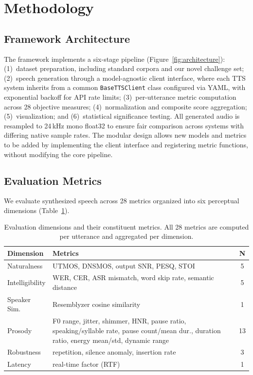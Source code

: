 \section{Methodology}

\subsection{Framework Architecture}

The framework implements a six-stage pipeline
(Figure~\ref{fig:architecture}): (1)~dataset preparation, including
standard corpora and our novel challenge set; (2)~speech generation through
a model-agnostic client interface, where each TTS system inherits from a
common \texttt{BaseTTSClient} class configured via YAML, with exponential
backoff for API rate limits; (3)~per-utterance metric computation across 28
objective measures; (4)~normalization and composite score aggregation;
(5)~visualization; and (6)~statistical significance testing. All generated
audio is resampled to 24\,kHz mono float32 to ensure fair comparison across
systems with differing native sample rates. The modular design allows new
models and metrics to be added by implementing the client interface and
registering metric functions, without modifying the core pipeline.

\subsection{Evaluation Metrics}

We evaluate synthesized speech across 28 metrics organized into six
perceptual dimensions (Table~\ref{tab:dimensions}).

\begin{table}[t]
\centering
\caption{Evaluation dimensions and their constituent metrics. All 28 metrics
are computed per utterance and aggregated per dimension.}
\label{tab:dimensions}
\small
\begin{tabular}{@{}p{1.6cm}p{4.4cm}c@{}}
\toprule
\textbf{Dimension} & \textbf{Metrics} & \textbf{N} \\
\midrule
Naturalness & UTMOS, DNSMOS, output SNR, PESQ, STOI & 5 \\
Intelligibility & WER, CER, ASR mismatch, word skip rate, semantic distance & 5 \\
Speaker Sim. & Resemblyzer cosine similarity & 1 \\
Prosody & F0 range, jitter, shimmer, HNR, pause ratio, speaking/syllable rate, pause count/mean dur., duration ratio, energy mean/std, dynamic range & 13 \\
Robustness & repetition, silence anomaly, insertion rate & 3 \\
Latency & real-time factor (RTF) & 1 \\
\bottomrule
\end{tabular}
\end{table}

